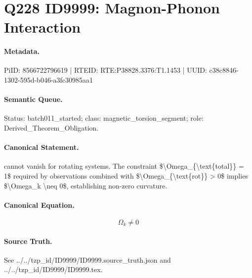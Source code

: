 \section*{Q228 ID9999: Magnon-Phonon Interaction}
\paragraph{Metadata.}
PiID: 8566722796619 | RTEID: RTE:P38828.3376:T1.1453 | UUID: c38c8846-1302-595d-b046-a3fc30985aa1

\paragraph{Semantic Queue.}
Status: batch011\_started; class: magnetic\_torsion\_segment; role: Derived\_Theorem\_Obligation.

\paragraph{Canonical Statement.}
cannot vanish for rotating systems. The constraint \$\textbackslash{}Omega\_\{\textbackslash{}text\{total\}\} = 1\$ required by observations combined with \$\textbackslash{}Omega\_\{\textbackslash{}text\{rot\}\} > 0\$ implies \$\textbackslash{}Omega\_k \textbackslash{}neq 0\$, establishing non-zero curvature.

\paragraph{Canonical Equation.}
\[
\Omega_k \neq 0
\]

\paragraph{Source Truth.}
See ../../tzp\_id/ID9999/ID9999.source\_truth.json and ../../tzp\_id/ID9999/ID9999.tex.
